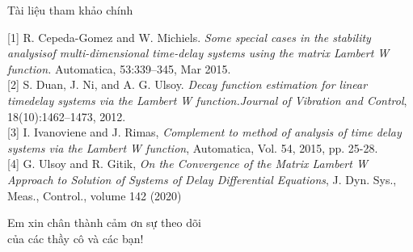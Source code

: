 \documentclass[10pt]{beamer}
\begin{document}
	
	\begin{frame}{Tài liệu tham khảo chính}
		
		
		
		
		[1] R. Cepeda-Gomez and W. Michiels. \textit{Some special cases in the stability analysisof multi-dimensional time-delay systems using the matrix Lambert W function.} Automatica, 53:339–345, Mar 2015.\\
		\vskip 0.2cm
		[2] S. Duan, J. Ni, and A. G. Ulsoy. \textit{Decay function estimation for linear timedelay systems via the Lambert W function.Journal of Vibration and Control}, 18(10):1462–1473, 2012.\\
		\vskip 0.2cm
		[3] I. Ivanoviene and J.	Rimas,	\emph{Complement	to	method	of	analysis	of	time	delay	systems	via	the	Lambert	W	function},	Automatica,	Vol.	54,	2015,	pp.	25-28.\\
		\vskip 0.2cm
		[4] G. Ulsoy and R. Gitik, \emph{On the Convergence of the Matrix Lambert W Approach to Solution of Systems of Delay Differential Equations}, J. Dyn. Sys., Meas., Control., volume 142 (2020)
		
		
	\end{frame}
	
	\begin{frame}{}
		\centering
		\Large{Em xin chân thành cảm ơn  sự theo dõi \\ của các thầy cô và các bạn!}
		
	\end{frame}
	
	
	
	
\end{document}
